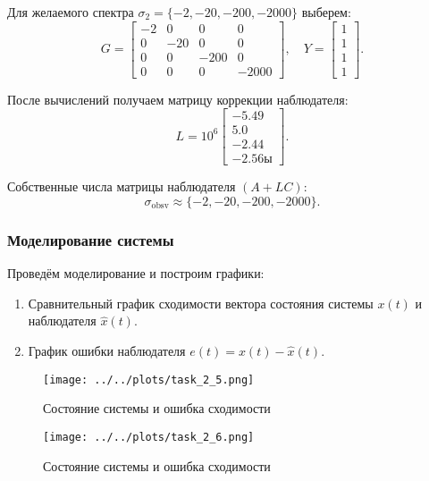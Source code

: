 Для желаемого спектра $\sigma_2 = \{-2, -20, -200, -2000\}$ выберем:
\[
G = \begin{bmatrix}
    -2 & 0 & 0 & 0 \\
    0 & -20 & 0 & 0 \\
    0 & 0 & -200 & 0\\
    0 & 0 & 0 & -2000\end{bmatrix}, \quad
Y = \begin{bmatrix}
    1 \\
    1 \\
    1 \\
    1
\end{bmatrix}.
\]

После вычислений получаем матрицу коррекции наблюдателя:
\[
L = 10^6\begin{bmatrix}
    -5.49 \\
    5.0 \\
    -2.44 \\
    -2.56ы
\end{bmatrix}.
\]

Собственные числа матрицы наблюдателя $(A + LC)$:
\[
\sigma_{\text{obsv}} \approx \{-2, -20, -200, -2000\}.
\]

\subsubsection{Моделирование системы}

Проведём моделирование и построим графики:
\begin{enumerate}
    \item Сравнительный график сходимости вектора состояния системы $x(t)$ и наблюдателя $\hat{x}(t)$.
    \item График ошибки наблюдателя $e(t) = x(t) - \hat{x}(t)$.
\end{enumerate}

\begin{figure}[H]
    \centering
    \texttt{[image: ../../plots/task\_2\_5.png]}
    \caption{Состояние системы и ошибка сходимости}
    \label{fig:task_2_state_error_system_2_1}
\end{figure}

\begin{figure}[H]
    \centering
    \texttt{[image: ../../plots/task\_2\_6.png]}
    \caption{Состояние системы и ошибка сходимости}
    \label{fig:task_2_state_error_system_2_2}
\end{figure}

